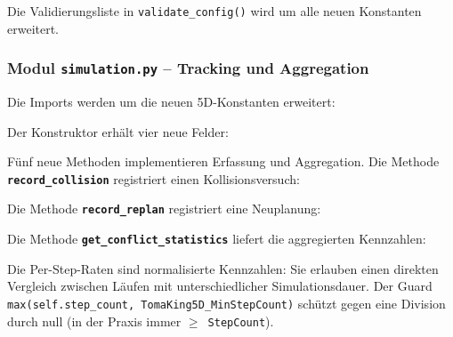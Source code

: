Die Validierungsliste in \texttt{validate\_config()} wird um alle neuen Konstanten erweitert.


\subsubsection{Modul \texttt{simulation.py} – Tracking und Aggregation}

Die Imports werden um die neuen 5D-Konstanten erweitert:



Der Konstruktor erhält vier neue Felder:



Fünf neue Methoden implementieren Erfassung und Aggregation. Die Methode \textbf{\texttt{record\_collision}} registriert einen Kollisionsversuch:



Die Methode \textbf{\texttt{record\_replan}} registriert eine Neuplanung:



Die Methode \textbf{\texttt{get\_conflict\_statistics}} liefert die aggregierten Kennzahlen:



Die Per-Step-Raten sind normalisierte Kennzahlen: Sie erlauben einen direkten Vergleich zwischen Läufen mit unterschiedlicher Simulationsdauer. Der Guard \texttt{max(self.step\_count, TomaKing5D\_MinStepCount)} schützt gegen eine Division durch null (in der Praxis immer $\geq$~\texttt{StepCount}).


